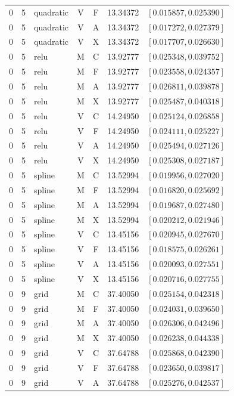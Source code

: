 \begin{longtable}{r r l c c r l}
0 & 5 & quadratic & V & F & 13.34372 & $[0.015857,0.025390]$ \\
0 & 5 & quadratic & V & A & 13.34372 & $[0.017272,0.027379]$ \\
0 & 5 & quadratic & V & X & 13.34372 & $[0.017707,0.026630]$ \\
0 & 5 & relu & M & C & 13.92777 & $[0.025348,0.039752]$ \\
0 & 5 & relu & M & F & 13.92777 & $[0.023558,0.024357]$ \\
0 & 5 & relu & M & A & 13.92777 & $[0.026811,0.039878]$ \\
0 & 5 & relu & M & X & 13.92777 & $[0.025487,0.040318]$ \\
0 & 5 & relu & V & C & 14.24950 & $[0.025124,0.026858]$ \\
0 & 5 & relu & V & F & 14.24950 & $[0.024111,0.025227]$ \\
0 & 5 & relu & V & A & 14.24950 & $[0.025494,0.027126]$ \\
0 & 5 & relu & V & X & 14.24950 & $[0.025308,0.027187]$ \\
0 & 5 & spline & M & C & 13.52994 & $[0.019956,0.027020]$ \\
0 & 5 & spline & M & F & 13.52994 & $[0.016820,0.025692]$ \\
0 & 5 & spline & M & A & 13.52994 & $[0.019687,0.027480]$ \\
0 & 5 & spline & M & X & 13.52994 & $[0.020212,0.021946]$ \\
0 & 5 & spline & V & C & 13.45156 & $[0.020945,0.027670]$ \\
0 & 5 & spline & V & F & 13.45156 & $[0.018575,0.026261]$ \\
0 & 5 & spline & V & A & 13.45156 & $[0.020093,0.027551]$ \\
0 & 5 & spline & V & X & 13.45156 & $[0.020716,0.027755]$ \\
0 & 9 & grid & M & C & 37.40050 & $[0.025154,0.042318]$ \\
0 & 9 & grid & M & F & 37.40050 & $[0.024031,0.039650]$ \\
0 & 9 & grid & M & A & 37.40050 & $[0.026306,0.042496]$ \\
0 & 9 & grid & M & X & 37.40050 & $[0.026238,0.044338]$ \\
0 & 9 & grid & V & C & 37.64788 & $[0.025868,0.042390]$ \\
0 & 9 & grid & V & F & 37.64788 & $[0.023650,0.039817]$ \\
0 & 9 & grid & V & A & 37.64788 & $[0.025276,0.042537]$ \\

\end{longtable}
